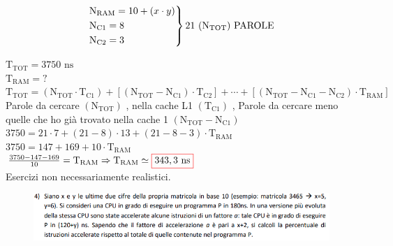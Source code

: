 \[
\begin{rcases*}
	\text{N}_\text{RAM} = 10 + (x \cdot y) \\
	\text{N}_\text{C1} = 8 \\
	\text{N}_\text{C2} = 3 \\
\end{rcases*} \text{21 ($ \text{N}_\text{TOT}$) PAROLE}
\]

$ \text{T}_\text{TOT} = 3750 \text{ ns} $ \\
$ \text{T}_\text{RAM} = ? $ \\

$ \text{T}_\text{TOT} = (\text{N}_\text{TOT} \cdot \text{T}_\text{C1}) + [(\text{N}_\text{TOT} - \text{N}_\text{C1}) \cdot \text{T}_\text{C2}] + \cdots + [(\text{N}_\text{TOT} - \text{N}_\text{C1} - \text{N}_\text{C2}) \cdot \text{T}_\text{RAM}] $ \\

\textsf{{\small Parole da cercare $(\text{N}_\text{TOT})$ , nella cache L1 $(\text{T}_\text{C1})$ , Parole da cercare meno quelle che ho già trovato nella cache 1 $(\text{N}_\text{TOT} - \text{N}_\text{C1})$}} \\

$ 3750 = 21 \cdot 7 + (21 - 8) \cdot 13 + (21 - 8 - 3) \cdot \text{T}_\text{RAM} $ \\

$ 3750 = 147 + 169 + 10 \cdot \text{T}_\text{RAM} $ \\

$ \frac{3750 - 147 - 169}{10} = \text{T}_\text{RAM} \Rightarrow \text{T}_\text{RAM} \simeq \color{red}\boxed{\normalcolor343,3 \text{ ns}} $ \\

\textsf{{\footnotesize Esercizi non necessariamente realistici.}} \\


\pagebreak

\begin{figure}[ht]
	\includegraphics[width=1\linewidth]{es4_MiglioramentoPrestazioneMemoria}
	\label{fig:es4MiglioramentoPrestazioneMemoria}
\end{figure}

